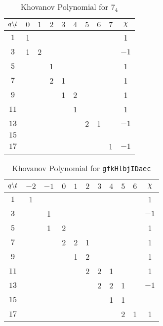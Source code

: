 \documentclass{article}
\theoremstyle{plain}
\begin{document}
        \begin{table}
            \centering
            \begin{tabular}{| c | c | c | c | c | c | c | c | c | c |}
                \hline
                $q\symbol{92}t$&$0$&$1$&$2$&$3$&$4$&$5$&$6$&$7$&$\chi$\\
                \hline
                $1$&1&&&&&&&&1\\
                \hline
                $3$&1&2&&&&&&&$-1$\\
                \hline
                $5$&&&1&&&&&&1\\
                \hline
                $7$&&&2&1&&&&&1\\
                \hline
                $9$&&&&1&2&&&&1\\
                \hline
                $11$&&&&&1&&&&1\\
                \hline
                $13$&&&&&&2&1&&$-1$\\
                \hline
                $15$&&&&&&&&&\\
                \hline
                $17$&&&&&&&&1&$-1$\\
                \hline
            \end{tabular}
            \caption{Khovanov Polynomial for $7_{4}$}
        \end{table}
        \begin{table}
            \centering
            \begin{tabular}{| c | c | c | c | c | c | c | c | c | c | c |}
                \hline
                $q\symbol{92}t$&$-2$&$-1$&$0$&$1$&$2$&$3$&$4$&$5$&$6$&$\chi$\\
                \hline
                $1$&1&&&&&&&&&1\\
                \hline
                $3$&&1&&&&&&&&$-1$\\
                \hline
                $5$&&1&2&&&&&&&1\\
                \hline
                $7$&&&2&2&1&&&&&1\\
                \hline
                $9$&&&&1&2&&&&&1\\
                \hline
                $11$&&&&&2&2&1&&&1\\
                \hline
                $13$&&&&&&2&2&1&&$-1$\\
                \hline
                $15$&&&&&&&1&1&&\\
                \hline
                $17$&&&&&&&&2&1&1\\
                \hline
            \end{tabular}
            \caption{Khovanov Polynomial for \texttt{gfkHlbjIDaec}}
        \end{table}
\end{document}
